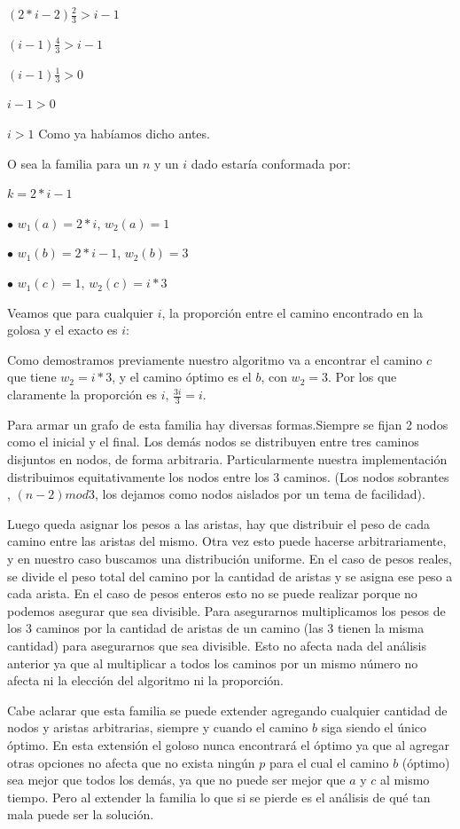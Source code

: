 $(2*i-2) \frac{2}{3} > i-1$

$(i-1) \frac{4}{3} > i-1$

$(i-1) \frac{1}{3} > 0$

$i-1 > 0$

$i > 1$ Como ya habíamos dicho antes.


O sea la familia para un $n$ y un $i$ dado estaría conformada por:

$k = 2*i-1$

$\bullet$ $w_1(a) = 2*i$, $w_2(a)=1$

$\bullet$ $w_1(b) = 2*i-1$, $w_2(b)=3$

$\bullet$ $w_1(c) = 1$, $w_2(c)=i*3$

Veamos que para cualquier $i$, la proporción entre el camino encontrado en la golosa y el exacto es $i$:

Como demostramos previamente nuestro algoritmo va a encontrar el camino $c$ que tiene $w_2=i*3$, y el camino óptimo es el $b$, con $w_2=3$. Por los que claramente la proporción es $i$, $\frac{3i}{3}=i$.

Para armar un grafo de esta familia hay diversas formas.Siempre se fijan 2 nodos como el inicial y el final. Los demás nodos se distribuyen entre tres caminos disjuntos en nodos, de forma arbitraria. Particularmente nuestra implementación distribuimos equitativamente los nodos entre los 3 caminos. (Los nodos sobrantes , $(n-2) mod 3$, los dejamos como nodos aislados por un tema de facilidad).

Luego queda asignar los pesos a las aristas, hay que distribuir el peso de cada camino entre las aristas del mismo. Otra vez esto puede hacerse arbitrariamente, y en nuestro caso buscamos una distribución uniforme.
En el caso de pesos reales, se divide el peso total del camino por la cantidad de aristas y se asigna ese peso a cada arista.
En el caso de pesos enteros esto no se puede realizar porque no podemos asegurar que sea divisible. Para asegurarnos multiplicamos los pesos de los 3 caminos por la cantidad de aristas de un camino (las 3 tienen la misma cantidad) para asegurarnos que sea divisible. Esto no afecta nada del análisis anterior ya que al multiplicar a todos los caminos por un mismo número no afecta ni la elección del algoritmo ni la proporción.

Cabe aclarar que esta familia se puede extender agregando cualquier cantidad de nodos y aristas arbitrarias, siempre y cuando el camino $b$ siga siendo el único óptimo. En esta extensión el goloso nunca encontrará el óptimo ya que al agregar otras opciones no afecta que no exista ningún $p$ para el cual el camino $b$ (óptimo) sea mejor que todos los demás, ya que no puede ser mejor que $a$ y $c$ al mismo tiempo. Pero al extender la familia lo que si se pierde es el análisis de	qué tan mala puede ser la solución.  
